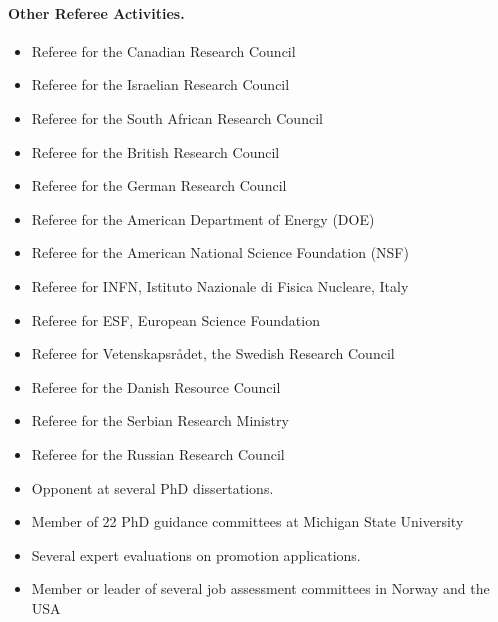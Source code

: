 \documentclass[a4wide,10pt]{article}
\begin{document}
\paragraph{Other Referee Activities.}
\begin{itemize}
\item Referee for the Canadian Research Council

\item Referee for the Israelian Research Council

\item Referee for the South African Research Council

\item Referee for the British Research Council

\item Referee for the German Research Council

\item Referee for the American Department of Energy (DOE)

\item Referee for the American National Science Foundation (NSF)

\item Referee for INFN, Istituto Nazionale di Fisica Nucleare, Italy

\item Referee for ESF, European Science Foundation

\item Referee for Vetenskapsrådet, the Swedish Research Council

\item Referee for the Danish Resource Council

\item Referee for the Serbian Research Ministry

\item Referee for the Russian Research Council

\item Opponent at several PhD dissertations.

\item Member of 22 PhD guidance committees at Michigan State University

\item Several expert evaluations on promotion applications.

\item Member or leader of several job assessment committees in Norway and the USA
\end{itemize}
\end{document}
